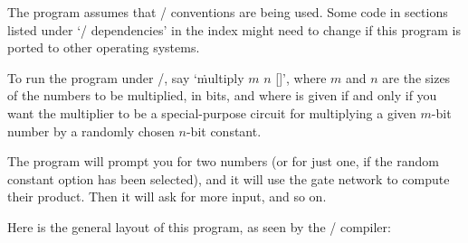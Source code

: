 The program assumes that \UNIX/ conventions are being used. Some code in
sections listed under `\UNIX/ dependencies' in the index might need to change
if this program is ported to other operating systems.

\def\<#1>{$\langle${\rm#1}$\rangle$}
To run the program under \UNIX/, say `\.{multiply} $m$ $n$ []',
where
$m$ and $n$ are the sizes of the numbers to be multiplied, in bits,
and where  is given if and only if you want the multiplier
to be a special-purpose circuit for multiplying a given $m$-bit
number by a randomly chosen $n$-bit constant.

The program will prompt you for two numbers (or for just one, if the
random constant option has been selected), and it will use the gate
network to compute their product. Then it will ask for more input, and so on.

\fi

Here is the general layout of this program, as seen by the \CEE/ compiler:

